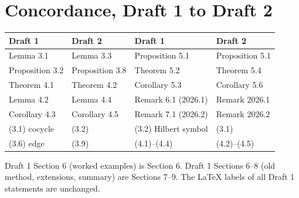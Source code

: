 \documentclass[12pt,letterpaper]{article}
\begin{document}
\section{Concordance, Draft 1 to Draft 2}
\begin{center}
\begin{tabular}{ll@{\qquad}ll}
\toprule
Draft 1 & Draft 2 & Draft 1 & Draft 2\\ \midrule
Lemma 3.1 & Lemma 3.3 & Proposition 5.1 & Proposition 5.1\\
Proposition 3.2 & Proposition 3.8 & Theorem 5.2 & Theorem 5.4\\
Theorem 4.1 & Theorem 4.2 & Corollary 5.3 & Corollary 5.6\\
Lemma 4.2 & Lemma 4.4 & Remark 6.1 (2026.1) & Remark 2026.1\\
Corollary 4.3 & Corollary 4.5 & Remark 7.1 (2026.2) & Remark 2026.2\\
(3.1) cocycle & (3.2) & (3.2) Hilbert symbol & (3.1)\\
(3.6) edge & (3.9) & (4.1)--(4.4) & (4.2)--(4.5)\\
\bottomrule
\end{tabular}
\end{center}
Draft 1 Section 6 (worked examples) is Section 6. Draft 1 Sections 6--8 (old method, extensions, summary) are Sections 7--9. The \LaTeX{} labels of all Draft 1 statements are unchanged.
\end{document}
